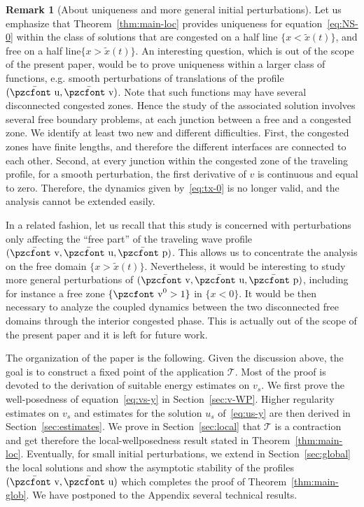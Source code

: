 \documentclass[10pt]{amsart}
\theoremstyle{definition}\newtheorem{defi}[theo]{Definition}\newtheorem{rema}[theo]{Remark}\newtheorem{exam}[theo]{Example}\newtheorem{exem}[theo]{Example}\newtheorem{nota}[theo]{Notation}
\newcommand{\mathpzc}[1]{\text{\pzcfont #1}}
\newcommand{\bv}{\bar{\mathpzc{v}}}
\newcommand{\bu}{\bar{\mathpzc{u}}}
\newcommand{\bp}{\bar{\mathpzc{p}}}
\newcommand{\cT}{\mathcal T}
\newcommand{\tv}{\mathpzc{v}}
\newcommand{\tx}{\widetilde{x}}
\begin{document}
\begin{rema}[About uniqueness and more general initial perturbations]
Let us emphasize that Theorem~\ref{thm:main-loc} provides uniqueness for equation~\eqref{eq:NS-0} within the class of solutions that are congested on a half line $\{x<\tx(t)\}$, and free on a half line\linebreak $\{x>\tx(t)\}$. An interesting question, which is out of the scope of the present paper, would be to prove uniqueness within a larger class of functions, e.g. smooth perturbations of translations of the profile $(\bu, \bv)$. Note that such functions may have several disconnected congested zones. Hence the study of the associated solution involves several free boundary problems, at each junction between a free and a congested zone. We identify at least two new and different difficulties. First, the congested zones have finite lengths, and therefore the different interfaces are connected to each other. Second, at every junction within the congested zone of the traveling profile, for a smooth perturbation, the first derivative of $v$ is continuous and equal to zero. Therefore, the dynamics given by~\eqref{eq:tx-0} is no longer valid, and the analysis cannot be extended easily. 

In a related fashion, let us recall that this study is concerned with perturbations only affecting the ``free part'' of the traveling wave profile $(\bv,\bu,\bp)$. This allows us to concentrate the analysis on the free domain $\{ x>\tx(t)\}$. Nevertheless, it would be interesting to study more general perturbations of $(\bv,\bu,\bp)$, including for instance a free zone $\{\tv^0 > 1\}$ in $\{x < 0\}$. It would be then necessary to analyze the coupled dynamics between the two disconnected free domains through the interior congested phase. This is actually out of the scope of the present paper and it is left for future work.
\end{rema}


The organization of the paper is the following. Given the discussion above, the goal is to construct a fixed point of the application $\cT$. Most of the proof is devoted to the derivation of suitable energy estimates on $v_s$. We first prove the well-posedness of equation~\eqref{eq:vs-y} in Section~\ref{sec:v-WP}. Higher regularity estimates on $v_s$ and estimates for the solution $u_s$ of~\eqref{eq:us-y} are then derived in Section~\ref{sec:estimates}. We prove in Section~\ref{sec:local} that $\cT$ is a contraction and get therefore the local-wellposedness result stated in Theorem~\ref{thm:main-loc}. Eventually, for small initial perturbations, we extend in Section~\ref{sec:global} the local solutions and show the asymptotic stability of the profiles $(\bv,\bu)$ which completes the proof of Theorem~\ref{thm:main-glob}. We have postponed to the Appendix several technical results.
\end{document}

